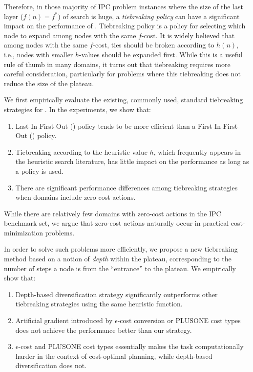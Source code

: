 Therefore, in those majority of IPC problem instances where the size of
the last layer ($f(n)=f^*$) of search is huge, a
\emph{tiebreaking policy} can have a significant impact on the
performance of \astar. Tiebreaking policy is a policy 
for selecting which node to expand among nodes with the same $f$-cost.
It is widely believed that among nodes with the same $f$-cost,
ties should be broken according to $h(n)$, i.e.,
nodes with smaller $h$-values should be expanded first.  While this is a
useful rule of thumb in many domains, it turns out that tiebreaking
requires more careful consideration, particularly for problems where
this tiebreaking does not reduce the size of the plateau.

We first empirically evaluate the existing, commonly used, standard
tiebreaking strategies for \astar.
In the experiments, we show that:
\begin{enumerate}
 \item Last-In-First-Out (\lifo) policy tends to be more efficient
       than a First-In-First-Out (\fifo) policy.
 \item Tiebreaking according to the heuristic value $h$, which
       frequently appears in the heuristic search literature, has little
       impact on the performance as long as a \lifo policy is used.
 \item There are significant performance differences among tiebreaking strategies
       when domains include zero-cost actions.
\end{enumerate}
While there are relatively few domains with zero-cost actions in the
IPC benchmark set, we argue that zero-cost actions naturally occur in 
practical cost-minimization problems.

In order to solve such problems more efficiently, we propose a new
tiebreaking method based on a notion of \emph{depth} within the plateau,
corresponding to the number of steps a node is from the ``entrance'' to
the plateau.  We empirically show that:
\begin{enumerate}
 \item Depth-based diversification strategy significantly outperforms
       other tiebreaking strategies using the same heuristic function.
 \item Artificial gradient introduced by $\epsilon$-cost conversion or
       PLUS\-ONE cost types does not achieve the performance better than
       our strategy.
 \item $\epsilon$-cost and PLUS\-ONE cost types essentially makes the
       task computationally harder in the context of cost-optimal
       planning, while depth-based diversification does not.
\end{enumerate}

